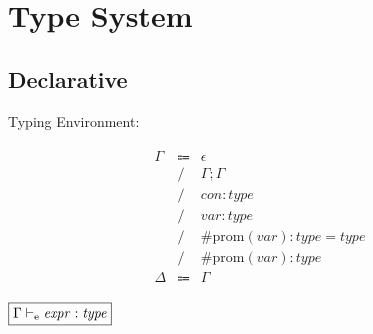 \chapter{Type System}

\section{Declarative}

Typing Environment:

\begin{align*}
    \begin{array}{rcll}
        \Gamma
        &\Coloneq &\epsilon \\
        &\mathrel{/} &\Gamma; \Gamma \\
        &\mathrel{/} &\mathit{con}: \mathit{type} \\
        &\mathrel{/} &\mathit{var}: \mathit{type} \\
        &\mathrel{/} &\mathrm{\#prom}(\mathit{var}): \mathit{type} = \mathit{type} \\
        &\mathrel{/} &\mathrm{\#prom}(\mathit{var}): \mathit{type} \\
        \Delta
        &\Coloneq &\Gamma
    \end{array}
\end{align*}

$\fbox{$\Gamma \vdash_\mathrm{e} \mathit{expr}: \mathit{type}$}$

